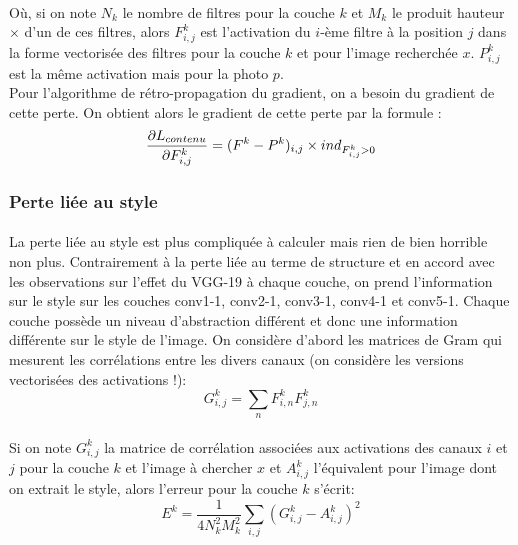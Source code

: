 \documentclass{article}
\begin{document}
\paragraph*{}
Où, si on note $N_k$ le nombre de filtres pour la couche $k$ et $M_k$ le produit hauteur $\times$ d'un de ces filtres, alors $F_{i,j}^k$ est l'activation du $i$-ème filtre à la position $j$ dans la forme vectorisée des filtres pour la couche $k$ et pour l'image recherchée $x$. $P_{i,j}^k$ est la même activation mais pour la photo $p$.\\
Pour l'algorithme de rétro-propagation du gradient, on a besoin du gradient de cette perte. On obtient alors le gradient de cette perte par la formule :
\begin{equation}
\pdv{L_{contenu}}{F_{i,j}^k} = (F^k-P^k)_{i,j} \times ind_{F_{i,j}^k > 0}
\end{equation}
 
\subsubsection*{Perte liée au style}
\paragraph*{}
La perte liée au style est plus compliquée à calculer mais rien de bien horrible non plus. Contrairement à la perte liée au terme de structure et en accord avec les observations sur l'effet du VGG-19 à chaque couche, on prend l'information sur le style sur les couches conv1-1, conv2-1, conv3-1, conv4-1 et conv5-1. Chaque couche possède un niveau d'abstraction différent et donc une information différente sur le style de l'image. On considère d'abord les matrices de Gram qui mesurent les corrélations entre les divers canaux (on considère les versions vectorisées des activations !):
\begin{equation}
G_{i,j}^k = \sum_n F_{i,n}^k F_{j,n}^k
\end{equation}
\paragraph*{}
Si on note $G_{i,j}^k$ la matrice de corrélation associées aux activations des canaux $i$ et $j$ pour la couche $k$ et l'image à chercher $x$ et $A_{i,j}^k$ l'équivalent pour l'image dont on extrait le style, alors l'erreur pour la couche $k$ s'écrit:
\begin{equation}
E^k = \frac{1}{4 N_k^2 M_k^2} \sum_{i,j}(G_{i,j}^k-A_{i,j}^k)^2
\end{equation}
\end{document}
